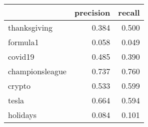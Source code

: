 \begin{tabular}{lrr}
\toprule
{} &  precision &  recall \\
\midrule
thanksgiving    &      0.384 &   0.500 \\
formula1        &      0.058 &   0.049 \\
covid19         &      0.485 &   0.390 \\
championsleague &      0.737 &   0.760 \\
crypto          &      0.533 &   0.599 \\
tesla           &      0.664 &   0.594 \\
holidays        &      0.084 &   0.101 \\
\bottomrule
\end{tabular}
